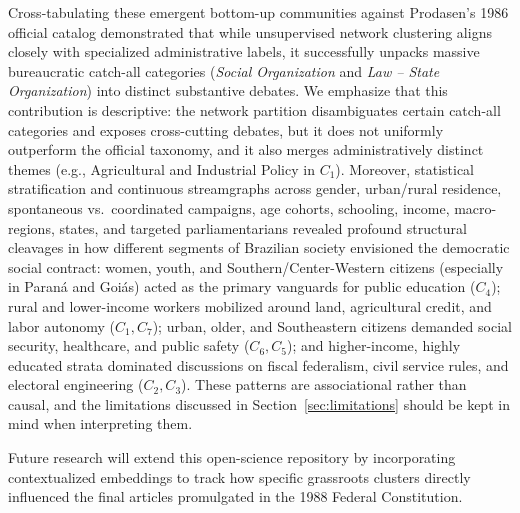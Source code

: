 \documentclass[pdflatex,sn-mathphys,iicol]{sn-jnl}
\begin{document}
Cross-tabulating these emergent bottom-up communities against Prodasen's 1986 official catalog demonstrated that while unsupervised network clustering aligns closely with specialized administrative labels, it successfully unpacks massive bureaucratic catch-all categories (\textit{Social Organization} and \textit{Law -- State Organization}) into distinct substantive debates. %
We emphasize that this contribution is descriptive: the network partition disambiguates certain catch-all categories and exposes cross-cutting debates, but it does not uniformly outperform the official taxonomy, and it also merges administratively distinct themes (e.g., Agricultural and Industrial Policy in $C_1$). Moreover, statistical stratification and continuous streamgraphs across gender, urban/rural residence, spontaneous vs.\ coordinated campaigns, age cohorts, schooling, income, macro-regions, states, and targeted parliamentarians revealed profound structural cleavages in how different segments of Brazilian society envisioned the democratic social contract: women, youth, and Southern/Center-Western citizens (especially in Paran\'{a} and Goi\'{a}s) acted as the primary vanguards for public education ($C_4$); rural and lower-income workers mobilized around land, agricultural credit, and labor autonomy ($C_1, C_7$); urban, older, and Southeastern citizens demanded social security, healthcare, and public safety ($C_6, C_5$); and higher-income, highly educated strata dominated discussions on fiscal federalism, civil service rules, and electoral engineering ($C_2, C_3$). These patterns are associational rather than causal, and the limitations discussed in Section~\ref{sec:limitations} should be kept in mind when interpreting them.

Future research will extend this open-science repository by incorporating contextualized embeddings \citep{amancio2025leveraging} to track how specific grassroots clusters directly influenced the final articles promulgated in the 1988 Federal Constitution.
\end{document}
